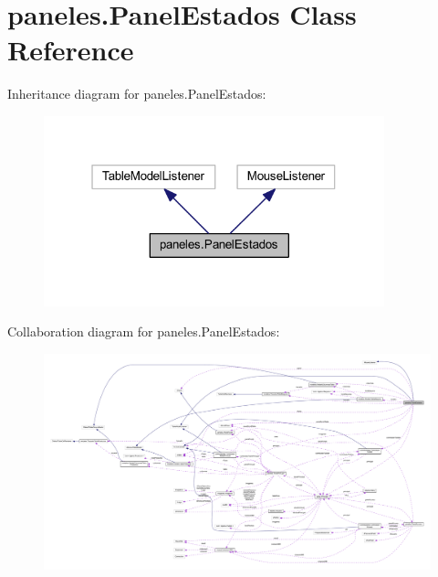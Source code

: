 \hypertarget{classpaneles_1_1_panel_estados}{}\section{paneles.\+Panel\+Estados Class Reference}
\label{classpaneles_1_1_panel_estados}


Inheritance diagram for paneles.\+Panel\+Estados\+:\nopagebreak
\begin{figure}[H]
\begin{center}
\leavevmode
\includegraphics[width=280pt]{classpaneles_1_1_panel_estados__inherit__graph}
\end{center}
\end{figure}


Collaboration diagram for paneles.\+Panel\+Estados\+:\nopagebreak
\begin{figure}[H]
\begin{center}
\leavevmode
\includegraphics[width=350pt]{classpaneles_1_1_panel_estados__coll__graph}
\end{center}
\end{figure}
